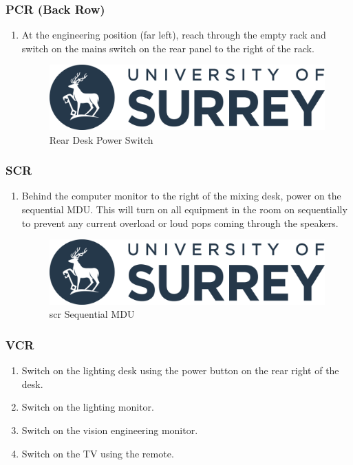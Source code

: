 \documentclass{report}
\begin{document}
\subsubsection{PCR (Back Row)}
          \begin{enumerate}
            \item At the engineering position (far left), reach through the empty rack and switch on the mains switch on the rear panel to the right of the rack.
            \begin{figure}[h]
                \centering
                \includegraphics[width=.5\linewidth]{uos-logo.png}
                \caption{Rear Desk Power Switch}
              \end{figure}
          \end{enumerate}

\subsubsection{SCR}
    \begin{enumerate}
        \item Behind the computer monitor to the right of the mixing desk, power on the sequential MDU. This will turn on all equipment in the room on sequentially to prevent any current overload or loud pops coming through the speakers.
        \begin{figure}[h]
            \centering
            \includegraphics[width=.5\linewidth]{uos-logo.png}
            \caption{\gls{scr} Sequential MDU}
          \end{figure}
    \end{enumerate}
\subsubsection{VCR}
\begin{enumerate}
    \item Switch on the lighting desk using the power button on the rear right of the desk.
    \item Switch on the lighting monitor.
    \item Switch on the vision engineering monitor.
    \item Switch on the TV using the remote.
\end{enumerate}
\end{document}
